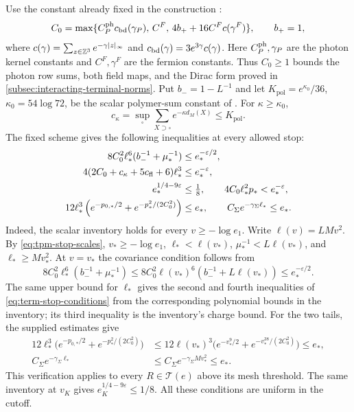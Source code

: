 Use the constant already fixed in the construction
\cite[(25)]{QED3Integration}:
\[
 C_0=\max\{C_P^{\rm ph}c_{\rm bd}(\gamma_P),\,
               C^F,\,4b_++16C^Fc(\gamma^F)\},\qquad b_+=1,
\]
where $c(\gamma)=\sum_{z\in\mathbb Z^3}e^{-\gamma|z|_\infty}$ and
$c_{\rm bd}(\gamma)=3e^{3\gamma}c(\gamma)$.
Here $C_P^{\rm ph},\gamma_P$ are the photon kernel constants
and $C^F,\gamma^F$ are the fermion constants. Thus $C_0\ge1$
bounds the photon row sums, both field maps, and the Dirac form
proved in \cref{subsec:interacting-terminal-norms}.
Put $b_-=1-L^{-1}$ and let
$K_{\mathrm{pol}}=e^{\kappa_0}/36$, $\kappa_0=54\log72$,
be the scalar polymer-sum constant of
\cite[Appendix~B, (81)]{NormalizedContraction}. For $\kappa\ge\kappa_0$,
\[
 c_\kappa=\sup_\square\sum_{X\supset\square}
                                      e^{-\kappa d_M(X)}\le K_{\mathrm{pol}}.
\]
The fixed scheme gives the following inequalities at every
allowed stop:
\begin{align}
 8C_0^2\ell_*^6(b_-^{-1}+\mu_*^{-1})
                   &\le e_*^{-\varepsilon/2},\nonumber\\
 4(2C_0+c_\kappa+5c_{\rm fl}+6)\ell_*^3
                   &\le e_*^{-\varepsilon},\nonumber\\
 e_*^{1/4-9\varepsilon}&\le\tfrac18,\qquad
 4C_0\ell_*^2p_*<e_*^{-\varepsilon},\nonumber\\
 12\ell_*^3\left(e^{-p_{0,*}/2}
                         +e^{-p_*^2/(2C_0^2)}\right)&\le e_*,
 \qquad
 C_\Sigma e^{-\gamma_\Sigma\ell_*}\le e_*.
                                      \label{eq:term-stop-conditions}
\end{align}
Indeed, the scalar inventory \cite[(29)]{QED3Integration}
holds for every $v\ge-\log e_1$. Write $\ell(v)=LMv^2$.
By \eqref{eq:tpm-stop-scales}, $v_*\ge-\log e_1$,
$\ell_*<\ell(v_*)$, $\mu_*^{-1}<L\ell(v_*)$, and
$\ell_*\ge Mv_*^2$. At $v=v_*$ the covariance condition follows from
\[
 8C_0^2\ell_*^6(b_-^{-1}+\mu_*^{-1})
 \le8C_0^2\ell(v_*)^6(b_-^{-1}+L\ell(v_*))
 \le e_*^{-\varepsilon/2}.
\]
The same upper bound for $\ell_*$ gives the second and fourth
inequalities of \eqref{eq:term-stop-conditions} from the
corresponding polynomial bounds in the inventory; its third
inequality is the inventory's charge bound. For the two tails,
the supplied estimates give
\begin{align*}
12\ell_*^3\big(e^{-p_{0,*}/2}+e^{-p_*^2/(2C_0^2)}\big)
 &\le12\ell(v_*)^3
       \big(e^{-v_*^9/2}+e^{-v_*^{38}/(2C_0^2)}\big)\le e_*,
\\
C_\Sigma e^{-\gamma_\Sigma\ell_*}
 &\le C_\Sigma e^{-\gamma_\Sigma Mv_*^2}\le e_*.
\end{align*}
This verification applies to every $R\in\mathcal T(e)$ above
its mesh threshold. The same inventory at $v_K$ gives
$e_K^{1/4-9\varepsilon}\le1/8$. All these conditions are
uniform in the cutoff.

